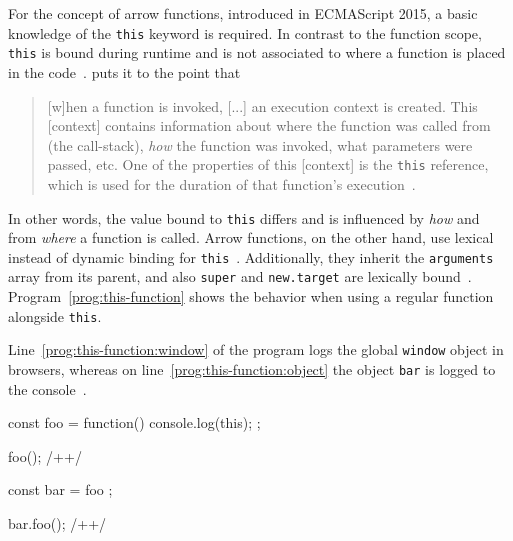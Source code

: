 For the concept of arrow functions, introduced in ECMAScript 2015, a basic knowledge of the \texttt{this} keyword is required. In contrast to the function scope, \texttt{this} is bound during runtime and is not associated to where a function is placed in the code~\cite[p.~9]{YDKJS:ThisAndObjectPrototypes:Simpson:2015}. \citeauthor{YDKJS:ThisAndObjectPrototypes:Simpson:2015} puts it to the point that
\begin{quote}
  [w]hen a function is invoked, [...] an execution context is created. This [context] contains information about where the function was called from (the call-stack), \emph{how} the function was invoked, what parameters were passed, etc. One of the properties of this [context] is the \texttt{this} reference, which is used for the duration of that function’s execution~\cite[p.~1]{YDKJS:ThisAndObjectPrototypes:Simpson:2015}.
\end{quote}
In other words, the value bound to \texttt{this} differs and is influenced by \emph{how} and from \emph{where} a function is called. Arrow functions, on the other hand, use lexical instead of dynamic binding for \texttt{this}~\cite[p.~58]{YDKJS:ES6AndBeyond:Simpson:2015}. Additionally, they inherit the \texttt{arguments} array from its parent, and also \texttt{super} and \texttt{new.target} are lexically bound~\cite[p.~59]{YDKJS:ES6AndBeyond:Simpson:2015}. Program~\ref{prog:this-function} shows the behavior when using a regular function alongside \texttt{this}.
\begin{program}
\caption{Line~\ref{prog:this-function:window} of the program logs the global \texttt{window} object in browsers, whereas on line~\ref{prog:this-function:object} the object \texttt{bar} is logged to the console~\cite[p.~18]{TypeScriptBook:Syed:2017}.}
\label{prog:this-function}
\begin{JsCode}
const foo = function() {
  console.log(this);
};

foo(); /+\label{prog:this-function:window}+/

const bar = { foo };

bar.foo(); /+\label{prog:this-function:object}+/
\end{JsCode}
\end{program}

